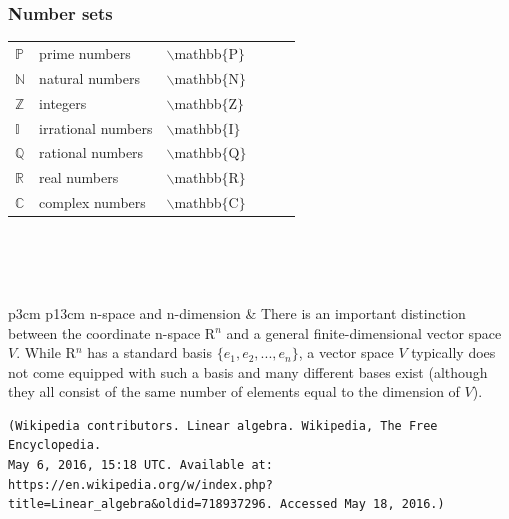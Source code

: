 \documentclass[10pt]{article}
\begin{document}
\subsubsection*{Number sets}
\begin{tabular}{p{1.5cm} p{3.4cm} p{2cm} p{2cm} p{2cm} p{2cm}}
$\mathbb{P}$ & prime numbers & $\backslash$mathbb$\lbrace \text{P} \rbrace$ & & &\\
$\mathbb{N}$ & natural numbers & $\backslash$mathbb$\lbrace \text{N} \rbrace$ & & &\\
$\mathbb{Z}$ & integers & $\backslash$mathbb$\lbrace \text{Z} \rbrace$ & & &\\
$\mathbb{I}$ & irrational numbers & $\backslash$mathbb$\lbrace \text{I} \rbrace$ & & &\\
$\mathbb{Q}$ & rational numbers & $\backslash$mathbb$\lbrace \text{Q} \rbrace$ & & &\\
$\mathbb{R}$ & real numbers & $\backslash$mathbb$\lbrace \text{R} \rbrace$ & & &\\
$\mathbb{C}$ & complex numbers & $\backslash$mathbb$\lbrace \text{C} \rbrace$ & & &\\
\end{tabular}
\\\\\\
\begin{tabular}{p{3cm} p{13cm}}
n-space \hspace{2cm} and n-dimension &
There is an important distinction between the coordinate n-space R$^n$ and a general finite-dimensional vector space $V$. While R$^n$ has a standard basis $\{ e_1, e_2, ..., e_n \}$, a vector space $V$ typically does not come equipped with such a basis and many different bases exist (although they all consist of the same number of elements equal to the dimension of $V$). \cite{wiki_LA}
\begin{verbatim}
(Wikipedia contributors. Linear algebra. Wikipedia, The Free Encyclopedia. 
May 6, 2016, 15:18 UTC. Available at: https://en.wikipedia.org/w/index.php?
title=Linear_algebra&oldid=718937296. Accessed May 18, 2016.)
\end{verbatim}
\end{tabular}
\end{document}
